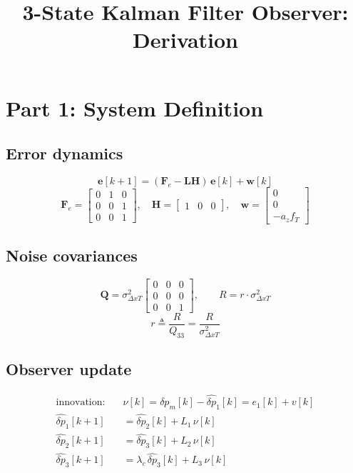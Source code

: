 \documentclass[11pt]{article}
\title{3-State Kalman Filter Observer: Derivation}
\author{}
\date{}
\newcommand{\dp}{\delta p}
\newcommand{\dph}{\hat{\delta p}}
\newcommand{\Fe}{\mathbf{F}_e}
\newcommand{\Hm}{\mathbf{H}}
\newcommand{\Qm}{\mathbf{Q}}
\newcommand{\Lm}{\mathbf{L}}
\begin{document}
\maketitle

\section*{Part 1: System Definition}

\subsection*{Error dynamics}
\begin{equation}
\mathbf{e}[k+1] = (\Fe - \Lm \Hm)\,\mathbf{e}[k] + \mathbf{w}[k]
\end{equation}
\begin{equation}
\Fe = \begin{bmatrix} 0 & 1 & 0 \\ 0 & 0 & 1 \\ 0 & 0 & 1 \end{bmatrix}, \quad
\Hm = \begin{bmatrix} 1 & 0 & 0 \end{bmatrix}, \quad
\mathbf{w} = \begin{bmatrix} 0 \\ 0 \\ -a_z f_T \end{bmatrix}
\end{equation}

\subsection*{Noise covariances}
\begin{equation}
\Qm = \sigma^2_{\Delta xT} \begin{bmatrix} 0&0&0\\0&0&0\\0&0&1 \end{bmatrix}, \qquad
R = r \cdot \sigma^2_{\Delta xT}
\end{equation}
\begin{equation}
r \triangleq \frac{R}{Q_{33}} = \frac{R}{\sigma^2_{\Delta xT}}
\end{equation}

\subsection*{Observer update}
\begin{align}
\text{innovation:} \quad & \nu[k] = \dp_m[k] - \dph_1[k] = e_1[k] + v[k] \\
\dph_1[k\!+\!1] &= \dph_2[k] + L_1\,\nu[k] \\
\dph_2[k\!+\!1] &= \dph_3[k] + L_2\,\nu[k] \\
\dph_3[k\!+\!1] &= \lambda_c\,\dph_3[k] + L_3\,\nu[k]
\end{align}
\end{document}
